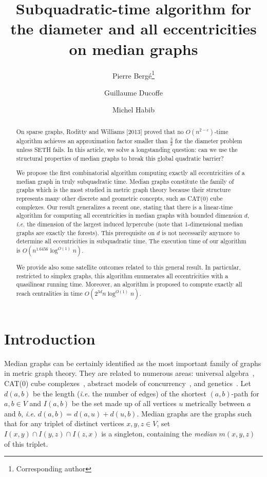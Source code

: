 \documentclass[a4paper,UKenglish,numberwithinsect,cleveref, autoref,anonymous]{lipics-v2021}
\title{Subquadratic-time algorithm for the diameter and all eccentricities on median graphs}
\author{Pierre Berg\'e\footnote{Corresponding author}}{Univ Lyon, CNRS, ENS de Lyon, Universit\'e Claude Bernard Lyon 1, LIP, France \and IRIF, CNRS, Universit\'e de Paris, France}{}{}{}
\author{Guillaume {Ducoffe}}{National Institute for Research and Development in Informatics, Romania \and University of Bucharest, Romania}{}{}{}
\author{Michel {Habib}}{IRIF, CNRS, Universit\'e de Paris, France}{}{}{}
\begin{document}
\maketitle

\begin{abstract}
On sparse graphs, Roditty and Williams [2013] proved that no $O(n^{2-\varepsilon})$-time algorithm achieves an approximation factor smaller than $\frac{3}{2}$ for the diameter problem unless SETH fails.
In this article, we solve a longstanding question: can we use the structural properties of median graphs to break this global quadratic barrier?

We propose the first combinatorial algorithm computing exactly all eccentricities of a median graph in truly subquadratic time. Median graphs constitute the family of graphs which is the most studied in metric graph theory because their structure represents many other discrete and geometric concepts, such as CAT(0) cube complexes. Our result generalizes a recent one, stating that there is a linear-time algorithm for computing all eccentricities in median graphs with bounded dimension $d$, {\em i.e.} the dimension of the largest induced hypercube (note that 1-dimensional median graphs are exactly the forests). This prerequisite on $d$ is not necessarily anymore to determine all eccentricities in subquadratic time. The execution time of our algorithm is $O(n^{1.6456}\log^{O(1)} n)$.

We provide also some satellite outcomes related to this general result. In particular, restricted to simplex graphs, this algorithm enumerates all eccentricities with a quasilinear running time. Moreover, an algorithm is proposed to compute exactly all reach centralities in time $O(2^{3d}n\log^{O(1)}n)$.
\end{abstract}

\newpage

\section{Introduction} \label{sec:intro}

Median graphs can be certainly identified as the most important family of graphs in metric graph theory. They are related to numerous areas: universal algebra~\cite{Av61,BiKi47}, CAT(0) cube complexes~\cite{BaCh08,Ch00}, abstract models of concurrency~\cite{BaCo93,SaNiWi93}, and genetics~\cite{BaQuSaMa02,BaFoSyRi95}. Let $d(a,b)$ be the length ({\em i.e.} the number of edges) of the shortest $(a,b)$-path for $a,b \in V$ and $I(a,b)$ be the set made up of all vertices $u$ metrically between $a$ and $b$, {\em i.e.} $d(a,b) = d(a,u) + d(u,b)$. Median graphs are the graphs such that for any triplet of distinct vertices $x,y,z \in V$, set $I(x,y) \cap I(y,z) \cap I(z,x)$ is a singleton, containing the \textit{median} $m(x,y,z)$ of this triplet.
\end{document}
